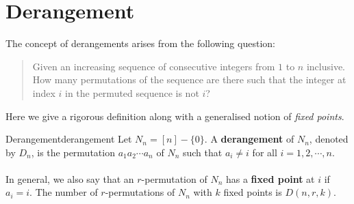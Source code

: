 \documentclass[math]{amznotes}
\theoremstyle{remark}
\begin{document}
\section{Derangement}
The concept of derangements arises from the following question:
\begin{quote}
    Given an increasing sequence of consecutive integers from $1$ to $n$ inclusive. How many permutations of the sequence are there such that the integer at index $i$ in the permuted sequence is not $i$?
\end{quote}
Here we give a rigorous definition along with a generalised notion of \textit{fixed points}.
\begin{dfnbox}{Derangement}{derangement}
    Let $N_n = [n] - \{0\}$. A {\color{red} \textbf{derangement}} of $N_n$, denoted by $D_n$, is the permutation $a_1a_2\cdots a_n$ of $N_n$ such that $a_i \neq i$ for all $i = 1, 2, \cdots, n$.
    \\\\
    In general, we also say that an $r$-permutation of $N_n$ has a {\color{red} \textbf{fixed point}} at $i$ if $a_i = i$. The number of $r$-permutations of $N_n$ with $k$ fixed points is $D(n, r, k)$.
\end{dfnbox}
\end{document}
